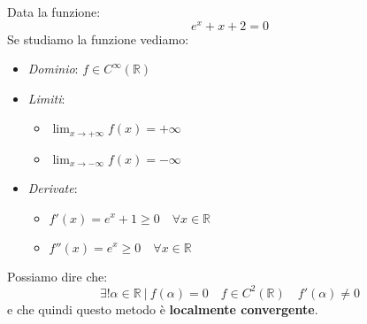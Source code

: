\begin{example}
	Data la funzione:
	\begin{equation*}
		e^x+x+2=0
	\end{equation*}
	Se studiamo la funzione vediamo:
	\begin{itemize}
		\item \textit{Dominio}: $f \in C^\infty(\mathbb{R})$
		\item \textit{Limiti}:
		\begin{itemize}
			\item $\lim_{x \to + \infty}f(x) = + \infty$
			\item $\lim_{x \to - \infty}f(x) = - \infty$
		\end{itemize}
		\item \textit{Derivate}:
		\begin{itemize}
			\item $f'(x) = e^x+1 \geq 0 \quad \forall x \in \mathbb{R}$
			\item $f''(x) = e^x \geq 0 \quad \forall x \in \mathbb{R}$
		\end{itemize}
	\end{itemize}
		\begin{center}
	\end{center}
	Possiamo dire che:
	\begin{equation*}
		\exists ! \alpha \in \mathbb{R} \:\vert\: f(\alpha)=0 \quad f \in C^2(\mathbb{R}) \quad f'(\alpha)\neq 0
	\end{equation*}
	e che quindi questo metodo è \textbf{localmente convergente}.
\end{example}

